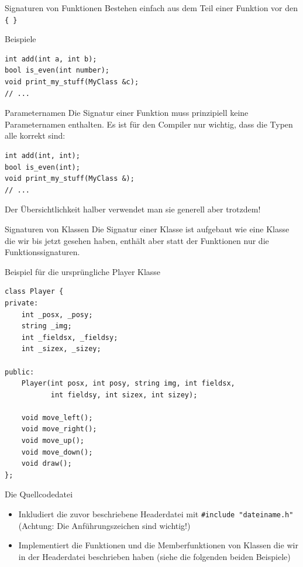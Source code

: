 \documentclass[presentation]{beamer}
\begin{document}
\begin{frame}[label={sec:orga76bc22},fragile]{Signaturen von Funktionen}
 Bestehen einfach aus dem \alert{Teil einer Funktion vor den {\color{solarizedYellow}\texttt{\{ \}}}}
\begin{block}{Beispiele}
\begin{verbatim}
int add(int a, int b);
bool is_even(int number);
void print_my_stuff(MyClass &c);
// ...
\end{verbatim}
\end{block}
\begin{block}{Parameternamen}
Die Signatur einer Funktion muss prinzipiell \alert{keine Parameternamen}
enthalten. Es ist für den Compiler nur wichtig, dass die Typen alle
korrekt sind:
\begin{verbatim}
int add(int, int);
bool is_even(int);
void print_my_stuff(MyClass &);
// ...
\end{verbatim}
Der Übersichtlichkeit halber \alert{verwendet man sie generell aber trotzdem}!
\end{block}
\end{frame}
\begin{frame}[label={sec:org4a15753},fragile]{Signaturen von Klassen}
 Die Signatur einer Klasse ist aufgebaut wie eine Klasse die wir bis
jetzt gesehen haben, \alert{enthält aber statt der Funktionen nur die
Funktionssignaturen}.
\begin{block}{Beispiel für die ursprüngliche Player Klasse}
\begin{verbatim}
class Player {
private:
    int _posx, _posy;      
    string _img;           
    int _fieldsx, _fieldsy;
    int _sizex, _sizey;    

public:
    Player(int posx, int posy, string img, int fieldsx,
           int fieldsy, int sizex, int sizey);

    void move_left();
    void move_right();
    void move_up();
    void move_down();
    void draw();
};
\end{verbatim}
\end{block}
\end{frame}
\begin{frame}[label={sec:org60aae87},fragile]{Die Quellcodedatei}
 \begin{itemize}
\item Inkludiert die zuvor beschriebene Headerdatei mit {\color{solarizedYellow}\texttt{\#include
  "dateiname.h"} }(\alert{Achtung:} Die Anführungszeichen sind wichtig!)
\item Implementiert die Funktionen und die Memberfunktionen von Klassen
die wir in der Headerdatei beschrieben haben (siehe die folgenden
beiden Beispiele)
\end{itemize}
\end{frame}
\end{document}
